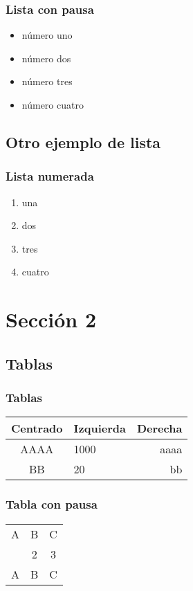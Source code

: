 \documentclass{beamer}
\begin{document}
\begin{frame}
\frametitle{Lista con pausa}
\begin{itemize}
\item número uno \pause 
\item número dos \pause 
\item número tres \pause 
\item número cuatro
\end{itemize} 
\end{frame}

\subsection{Otro ejemplo de lista}
\begin{frame}
\frametitle{Lista numerada}
\begin{enumerate}
\item una  
\item dos 
\item tres 
\item cuatro
\end{enumerate}
\end{frame}

\section{Sección 2} 
\subsection{Tablas}

\begin{frame}
\frametitle{Tablas}
\begin{tabular}{|c|l|r|} \hline
\textbf{Centrado} & \textbf{Izquierda} & \textbf{Derecha} \\ \hline
AAAA  & 1000 & aaaa \\ \hline
BB    & 20   & bb \\ \hline
\end{tabular}
\end{frame}

\begin{frame}
\frametitle{Tabla con pausa}
\begin{tabular}{c c c}
A & B & C \\ \pause 
1 & 2 & 3 \\  \pause 
A & B & C \\ 
\end{tabular} 
\end{frame}
\end{document}

